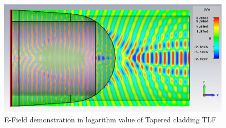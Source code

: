 \begin{figure}[!ht]
	\centering
		\includegraphics[width=0.8 \textwidth]{bilder/cst_lensed_fiber_equ_efield}
		\caption{E-Field demonstration in logarithm value of Tapered cladding TLF}
 		\label{fig:Tapered_cladding_efield}
\end{figure}

